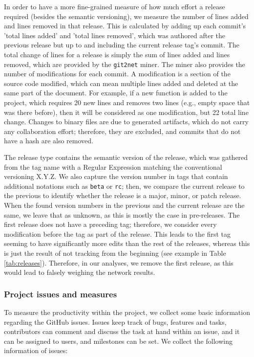 In order to have a more fine-grained measure of how much effort a release required (besides the semantic versioning), we measure the number of lines added and lines removed in that release. This is calculated by adding up each commit's 'total lines added' and 'total lines removed', which was authored after the previous release but up to and including the current release tag's commit. The total change of lines for a release is simply the sum of lines added and lines removed, which are provided by the \texttt{git2net} miner. The miner also provides the number of modifications for each commit. A modification is a section of the source code modified, which can mean multiple lines added and deleted at the same part of the document. For example, if a new function is added to the project, which requires 20 new lines and removes two lines (e.g., empty space that was there before), then it will be considered as one modification, but 22 total line change. Changes to binary files are due to generated artifacts, which do not carry any collaboration effort; therefore, they are excluded, and commits that do not have a hash are also removed.

The release type contains the semantic version of the release, which was gathered from the tag name with a Regular Expression matching the conventional versioning X.Y.Z. We also capture the version number in tags that contain additional notations such as \texttt{beta} or \texttt{rc}; then, we compare the current release to the previous to identify whether the release is a major, minor, or patch release. When the found version numbers in the previous and the current release are the same, we leave that as unknown, as this is mostly the case in pre-releases. The first release does not have a preceding tag; therefore, we consider every modification before the tag as part of the release. This leads to the first tag seeming to have significantly more edits than the rest of the releases, whereas this is just the result of not tracking from the beginning (see example in Table \ref{tab:releases}). Therefore, in our analyses, we remove the first release, as this would lead to falsely weighing the network results.



\subsubsection{Project issues and measures}
\label{sec:project_issues}

To measure the productivity within the project, we collect some basic information regarding the GitHub issues. Issues keep track of bugs, features and tasks, contributors can comment and discuss the task at hand within an issue, and it can be assigned to users, and milestones can be set. We collect the following information of issues:

